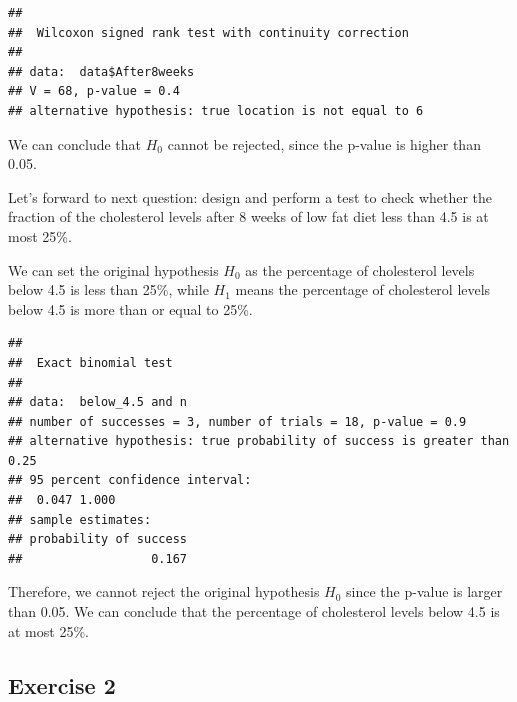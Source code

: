 \documentclass[
]{article}
\newenvironment{Shaded}{\begin{snugshade}}{\end{snugshade}}
\newcommand{\AttributeTok}[1]{\textcolor[rgb]{0.13,0.29,0.53}{#1}}
\newcommand{\CommentTok}[1]{\textcolor[rgb]{0.56,0.35,0.01}{\textit{#1}}}
\newcommand{\FloatTok}[1]{\textcolor[rgb]{0.00,0.00,0.81}{#1}}
\newcommand{\FunctionTok}[1]{\textcolor[rgb]{0.13,0.29,0.53}{\textbf{#1}}}
\newcommand{\NormalTok}[1]{#1}
\newcommand{\OtherTok}[1]{\textcolor[rgb]{0.56,0.35,0.01}{#1}}
\newcommand{\SpecialCharTok}[1]{\textcolor[rgb]{0.81,0.36,0.00}{\textbf{#1}}}
\newcommand{\StringTok}[1]{\textcolor[rgb]{0.31,0.60,0.02}{#1}}
\begin{document}
\begin{verbatim}
## 
##  Wilcoxon signed rank test with continuity correction
## 
## data:  data$After8weeks
## V = 68, p-value = 0.4
## alternative hypothesis: true location is not equal to 6
\end{verbatim}

We can conclude that \(H_0\) cannot be rejected, since the p-value is
higher than 0.05.

Let's forward to next question: design and perform a test to check
whether the fraction of the cholesterol levels after 8 weeks of low fat
diet less than 4.5 is at most 25\%.

We can set the original hypothesis \(H_0\) as the percentage of
cholesterol levels below 4.5 is less than 25\%, while \(H_1\) means the
percentage of cholesterol levels below 4.5 is more than or equal to
25\%.

\begin{Shaded}
\end{Shaded}

\begin{verbatim}
## 
##  Exact binomial test
## 
## data:  below_4.5 and n
## number of successes = 3, number of trials = 18, p-value = 0.9
## alternative hypothesis: true probability of success is greater than 0.25
## 95 percent confidence interval:
##  0.047 1.000
## sample estimates:
## probability of success 
##                  0.167
\end{verbatim}

Therefore, we cannot reject the original hypothesis \(H_0\) since the
p-value is larger than 0.05. We can conclude that the percentage of
cholesterol levels below 4.5 is at most 25\%.

\subsection{Exercise 2}\label{exercise-2}
\end{document}
